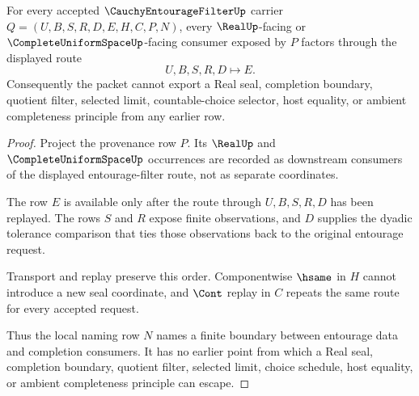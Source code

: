 \begin{theorem}
\label{thm:cauchy-entourage-filter-real-seal-nonescape}
For every accepted $\CauchyEntourageFilterUp$ carrier $Q=(U,B,S,R,D,E,H,C,P,N)$, every $\RealUp$-facing or $\CompleteUniformSpaceUp$-facing consumer exposed by $P$ factors through the displayed route
$$
U,B,S,R,D \longmapsto E .
$$
Consequently the packet cannot export a Real seal, completion boundary, quotient filter, selected limit, countable-choice selector, host equality, or ambient completeness principle from any earlier row.
\end{theorem}
\begin{proof}
Project the provenance row $P$. Its $\RealUp$ and $\CompleteUniformSpaceUp$ occurrences are recorded as downstream consumers of the displayed entourage-filter route, not as separate coordinates.

The row $E$ is available only after the route through $U,B,S,R,D$ has been replayed. The rows $S$ and $R$ expose finite observations, and $D$ supplies the dyadic tolerance comparison that ties those observations back to the original entourage request.

Transport and replay preserve this order. Componentwise $\hsame$ in $H$ cannot introduce a new seal coordinate, and $\Cont$ replay in $C$ repeats the same route for every accepted request.

Thus the local naming row $N$ names a finite boundary between entourage data and completion consumers. It has no earlier point from which a Real seal, completion boundary, quotient filter, selected limit, choice schedule, host equality, or ambient completeness principle can escape.
\end{proof}


\begin{closurestatus}{\CauchyEntourageFilterUp}
  \theoryclosure{\seedClosure}
  \formalstatus{\unformalizedV}
\end{closurestatus}
